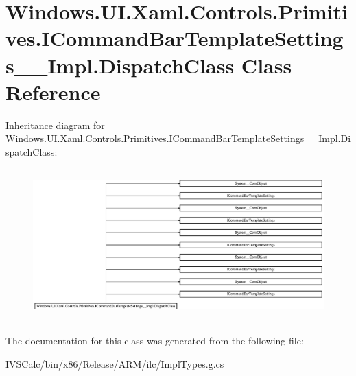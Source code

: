 \hypertarget{class_windows_1_1_u_i_1_1_xaml_1_1_controls_1_1_primitives_1_1_i_command_bar_template_settings_____impl_1_1_dispatch_class}{}\section{Windows.\+U\+I.\+Xaml.\+Controls.\+Primitives.\+I\+Command\+Bar\+Template\+Settings\+\_\+\+\_\+\+Impl.\+Dispatch\+Class Class Reference}
\label{class_windows_1_1_u_i_1_1_xaml_1_1_controls_1_1_primitives_1_1_i_command_bar_template_settings_____impl_1_1_dispatch_class}
Inheritance diagram for Windows.\+U\+I.\+Xaml.\+Controls.\+Primitives.\+I\+Command\+Bar\+Template\+Settings\+\_\+\+\_\+\+Impl.\+Dispatch\+Class\+:\begin{figure}[H]
\begin{center}
\leavevmode
\includegraphics[height=5.900383cm]{class_windows_1_1_u_i_1_1_xaml_1_1_controls_1_1_primitives_1_1_i_command_bar_template_settings_____impl_1_1_dispatch_class}
\end{center}
\end{figure}


The documentation for this class was generated from the following file\+:\begin{DoxyCompactItemize}
\item 
I\+V\+S\+Calc/bin/x86/\+Release/\+A\+R\+M/ilc/Impl\+Types.\+g.\+cs\end{DoxyCompactItemize}
